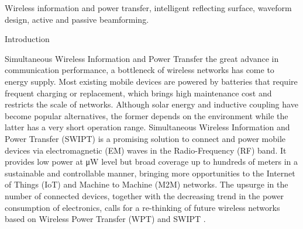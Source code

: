 \documentclass[journal]{IEEEtran}
\begin{document}
	\begin{IEEEkeywords}
		Wireless information and power transfer, intelligent reflecting surface, waveform design, active and passive beamforming.
	\end{IEEEkeywords}


	\begin{section}{Introduction}
		\begin{subsection}{Simultaneous Wireless Information and Power Transfer}
			 the great advance in communication performance, a bottleneck of wireless networks has come to energy supply. Most existing mobile devices are powered by batteries that require frequent charging or replacement, which brings high maintenance cost and restricts the scale of networks. Although solar energy and inductive coupling have become popular alternatives, the former depends on the environment while the latter has a very short operation range. Simultaneous Wireless Information and Power Transfer (SWIPT) is a promising solution to connect and power mobile devices via electromagnetic (EM) waves in the Radio-Frequency (RF) band. It provides low power at \si{\uW} level but broad coverage up to hundreds of meters in a sustainable and controllable manner, bringing more opportunities to the Internet of Things (IoT) and Machine to Machine (M2M) networks. The upsurge in the number of connected devices, together with the decreasing trend in the power consumption of electronics, calls for a re-thinking of future wireless networks based on Wireless Power Transfer (WPT) and SWIPT \cite{Clerckx2019}.


\end{subsection}
\end{section}
\end{document}
